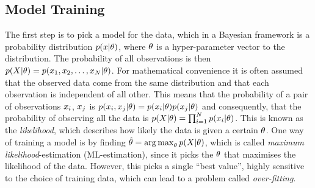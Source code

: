 \subsection{Model Training}
The first step is to pick a model for the data, which in a Bayesian
framework is a probability distribution $p(x \vert \theta)$, where
$\theta$ is a hyper-parameter vector to the distribution. The
probability of all observations is then $p(X \vert \theta) =
p(x_1, x_2, \dots, x_N \vert \theta)$. For
mathematical convenience it is often assumed that the observed data
come from the same distribution and that each observation is
independent of all other. This means that the probability of a pair of observations $x_i$, $x_j$ is $p(x_i, x_j
\vert \theta) = p(x_i \vert \theta)p(x_j
\vert \theta)$ and consequently, that the probability of observing all the data
is $p(X \vert \theta) = \prod_{i=1}^Np(x_i \vert \theta)$.
This is known as the \textit{likelihood}, which describes how likely
the data is given a certain $\theta$. One way of training a model is
by finding $\hat{\theta} = \operatorname*{arg\,max}_\theta p(X \vert \theta)$, 
which is called \textit{maximum likelihood}-estimation (ML-estimation), since it picks the
$\theta$ that maximises the likelihood of the data. However, this picks a single
``best value'', highly sensitive to the choice of training data, which
can lead to a problem called \textit{over-fitting}.

